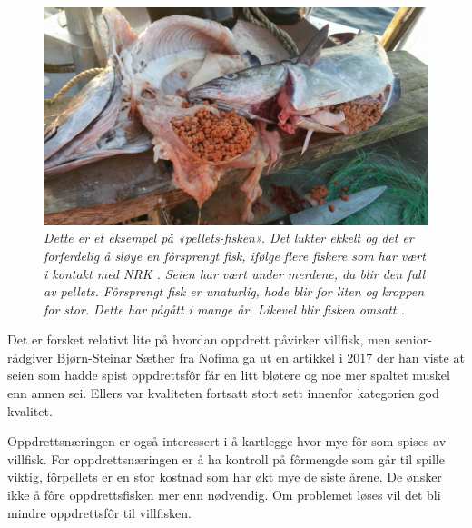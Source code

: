 \begin{figure} 
\begin{center} 
\includegraphics[scale=0.2]{figures/oppdrettfor}
\caption{\small \sl Dette er et eksempel på «pellets-fisken». Det lukter ekkelt og det er forferdelig å sløye en fôrsprengt fisk, ifølge flere fiskere som har vært i kontakt med NRK \cite{Trana m.fl. 2019}. Seien har vært under merdene, da blir den full av pellets. Fôrsprengt fisk er unaturlig, hode blir for liten og kroppen for stor. Dette har pågått i mange år. Likevel blir fisken omsatt \cite{Angell og Ekanger 2017}. \label{fig:oppdrettfor}} 
\end{center} 
\end{figure} 

Det er forsket relativt lite på hvordan oppdrett påvirker villfisk, men senior-rådgiver Bjørn-Steinar Sæther fra Nofima ga ut en artikkel i 2017 der han viste at seien som hadde spist oppdrettsfôr får en litt bløtere og noe mer spaltet muskel enn annen sei. Ellers var kvaliteten fortsatt stort sett innenfor kategorien god kvalitet. \cite{Saether 2017}


Oppdrettsnæringen er også interessert i å kartlegge hvor mye fôr som spises av villfisk. For oppdrettsnæringen er å ha kontroll på fôrmengde som går til spille viktig, fôrpellets er en stor kostnad som har økt mye de siste årene. De ønsker ikke å fôre oppdrettsfisken mer enn nødvendig. Om problemet løses vil det bli mindre oppdrettsfôr til villfisken. \cite{Baevre-Jensen 2019}

